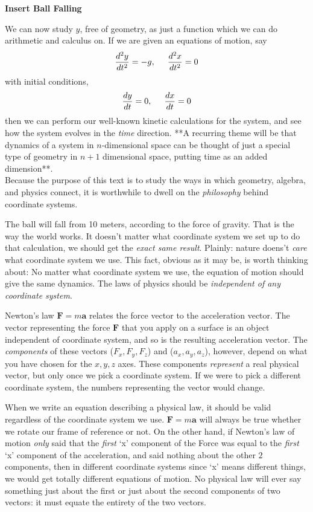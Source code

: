 \documentclass[../master.tex]{subfiles}
\begin{document}
	\textbf{Insert Ball Falling}
	
	We can now study $y$, free of geometry, as just a function which we can do arithmetic and calculus on. If we are given an equations of motion, say 
	\begin{equation*}
		\frac{d^2y}{dt^2} = -g, \hspace{5mm} \frac{d^2x}{dt^2} = 0
	\end{equation*} 
	with initial conditions,
	\begin{equation*}
		\frac{dy}{dt}=0, \hspace{5mm} \frac{dx}{dt}=0
	\end{equation*}
	 then we can perform our well-known kinetic calculations for the system, and see how the system evolves in the \emph{time} direction. **A recurring theme will be that dynamics of a system in $n$-dimensional space can be thought of just a special type of geometry in $n+1$ dimensional space, putting time as an added dimension**.\\
	
	Because the purpose of this text is to study the ways in which geometry, algebra, and physics connect, it is worthwhile to dwell on the \emph{philosophy} behind coordinate systems.
	
	The ball will fall from 10 meters, according to the force of gravity. That is the way the world works. It doesn't matter what coordinate system we set up to do that calculation, we should get the \emph{exact same result}. Plainly: nature doens't \emph{care} what coordinate system we use. This fact, obvious as it may be, is worth thinking about: No matter what coordinate system we use, the equation of motion should give the same dynamics. The laws of physics should be \emph{independent of any coordinate system}.
	
	Newton's law $\mathbf F = m \mathbf a$ relates the force vector to the acceleration vector. The vector representing the force $\mathbf F$ that you apply on a surface is an object independent of coordinate system, and so is the resulting acceleration vector. The \emph{components} of these vectors ($F_x, F_y, F_z$) and ($a_x, a_y, a_z$), however, depend on what you have chosen for the $x,y,z$ axes. These components \emph{represent} a real physical vector, but only once we pick a coordinate system. If we were to pick a different coordinate system, the numbers representing the vector would change. 
	
	When we write an equation describing a physical law, it should be valid regardless of the coordinate system we use. $\mathbf F = m \mathbf a$ will always be true whether we rotate our frame of reference or not. On the other hand, if Newton's law of motion \emph{only} said that the \emph{first} `x' component of the Force was equal to the \emph{first} `x' component of the acceleration, and said nothing about the other $2$ components, then in different coordinate systems since `x' means different things, we would get totally different equations of motion. No physical law will ever say something just about the first or just about the second components of two vectors: it must equate the entirety of the two vectors. 
	
\end{document}
